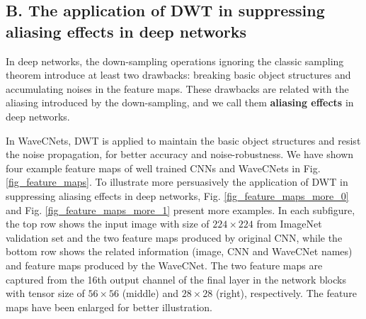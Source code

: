 \subsection*{B. The application of DWT in suppressing aliasing effects in deep networks}
In deep networks, the down-sampling operations ignoring the classic sampling theorem introduce at least two drawbacks:
breaking basic object structures and accumulating noises in the feature maps.
These drawbacks are related with the aliasing introduced by the down-sampling,
and we call them \textbf{aliasing effects} in deep networks.

In WaveCNets, DWT is applied to maintain the basic object structures and resist the noise propagation,
for better accuracy and noise-robustness.
We have shown four example feature maps of well trained CNNs and WaveCNets in Fig. \ref{fig_feature_maps}.
To illustrate more persuasively the application of DWT in suppressing aliasing effects in deep networks,
Fig. \ref{fig_feature_maps_more_0} and Fig. \ref{fig_feature_maps_more_1} present more examples.
In each subfigure, the top row shows the input image with size of $224 \times 224$ from ImageNet validation set
and the two feature maps produced by original CNN,
while the bottom row shows the related information (image, CNN and WaveCNet names) and feature maps produced by the WaveCNet.
The two feature maps are captured from the 16th output channel of the final layer
in the network blocks with tensor size of $56 \times 56$ (middle) and $28 \times 28$ (right), respectively.
The feature maps have been enlarged for better illustration.

